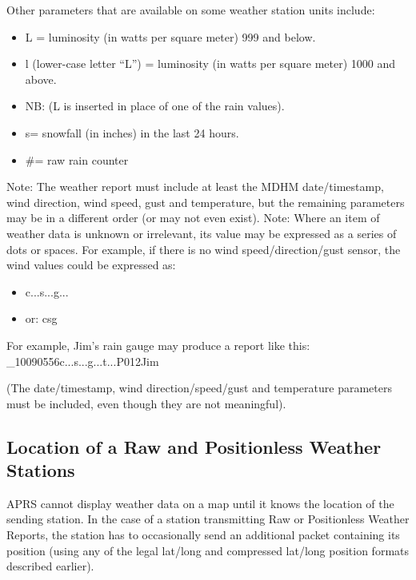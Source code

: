 Other parameters that are available on some weather station units include:
\begin{itemize}
\item L = luminosity (in watts per square meter) 999 and below.

\item l (lower-case letter “L”) = luminosity (in watts per square meter) 1000 and above.
\item NB: (L is inserted in place of one of the rain values).
\item s= snowfall (in inches) in the last 24 hours.
\item \#= raw rain counter
\end{itemize}

Note: The weather report must include at least the MDHM date/timestamp,
wind direction, wind speed, gust and temperature, but the remaining
parameters may be in a different order (or may not even exist).
Note: Where an item of weather data is unknown or irrelevant, its value may
be expressed as a series of dots or spaces. For example, if there is no wind
speed/direction/gust sensor, the wind values could be expressed as:
\begin{itemize}
\item c...s...g...
\item  or: c\textvisiblespace\textvisiblespace\textvisiblespace s\textvisiblespace\textvisiblespace\textvisiblespace g \textvisiblespace\textvisiblespace\textvisiblespace
\end{itemize}

For example, Jim’s rain gauge may produce a report like this:\\
\_10090556c...s...g...t...P012Jim

(The date/timestamp, wind direction/speed/gust and temperature parameters
must be included, even though they are not meaningful).


\subsection{Location of a Raw and Positionless Weather Stations}

APRS cannot display weather data on a map until it knows the location of the
sending station. In the case of a station transmitting Raw or Positionless
Weather Reports, the station has to occasionally send an additional packet
containing its position (using any of the legal lat/long and compressed
lat/long position formats described earlier).

